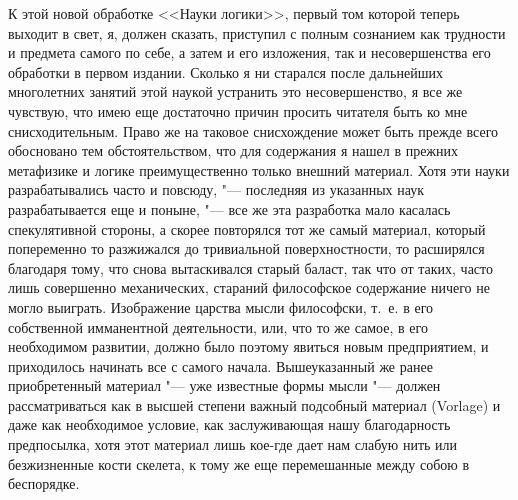 К этой новой обработке <<Науки логики>>, первый
том которой теперь выходит в свет, я, должен сказать, приступил с полным
сознанием как трудности и предмета самого по себе, а затем и его изложения,
так и несовершенства его обработки в первом издании. Сколько я ни старался
после дальнейших многолетних занятий этой наукой устранить это
несовершенство, я все же чувствую, что имею еще достаточно причин просить
читателя быть ко мне снисходительным. Право же на таковое снисхождение
может быть прежде всего обосновано тем обстоятельством, что для содержания
я нашел в прежних метафизике и логике преимущественно только внешний
материал. Хотя эти науки разрабатывались часто и повсюду, "--- последняя из
указанных наук разрабатывается еще и поныне, "--- все же эта разработка мало
касалась спекулятивной стороны, а скорее повторялся тот же самый материал,
который попеременно то разжижался до тривиальной поверхностности, то
расширялся благодаря тому, что снова вытаскивался старый баласт, так что от
таких, часто лишь совершенно механических, стараний философское содержание
ничего не могло выиграть. Изображение царства мысли философски, т.~е. в его
собственной имманентной деятельности, или, что то же самое, в его
необходимом развитии, должно было поэтому явиться новым предприятием, и
приходилось начинать все с самого начала. Вышеуказанный же ранее приобретенный
материал "--- уже известные формы мысли "--- должен рассматриваться
как в высшей степени важный подсобный материал (Vorlage) и даже как
необходимое условие, как заслуживающая нашу благодарность предпосылка, хотя
этот материал лишь кое-где дает нам слабую нить или безжизненные кости
скелета, к тому же еще перемешанные между собою в беспорядке.

